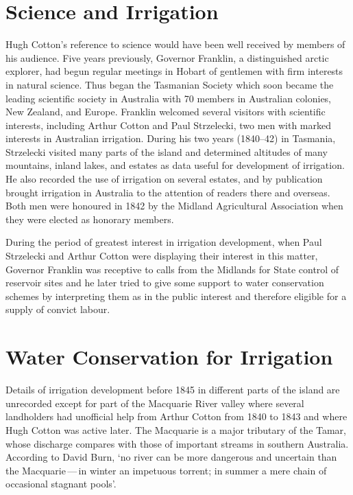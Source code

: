 \section*{Science and Irrigation}

Hugh Cotton's reference to science would have been well received by
members of his audience.  Five years previously, Governor
Franklin, a distinguished arctic explorer,
had begun regular meetings in Hobart of gentlemen with firm interests
in natural science.  Thus began the Tasmanian Society which soon
became the leading scientific society in Australia with 70 members in
Australian colonies, New Zealand, and Europe.  Franklin welcomed
several visitors with scientific interests, including Arthur Cotton
and Paul Strzelecki, two men with marked
interests in Australian irrigation.  During his two years (1840--42)
in Tasmania, Strzelecki visited many parts of the island and
determined altitudes of many mountains, inland lakes, and estates as
data useful for development of irrigation.  He also recorded the use
of irrigation on several estates, and by publication brought
irrigation in Australia to the attention of readers there and
overseas.  Both men were honoured in 1842 by the Midland Agricultural
Association when they were elected as honorary members.

During the period of greatest interest in irrigation development, when
Paul Strzelecki and Arthur Cotton were displaying their interest in
this matter, Governor Franklin was receptive to calls from the
Midlands for State control of reservoir sites and he later tried to
give some support to water conservation schemes by interpreting them
as in the public interest and therefore eligible for a supply of
convict labour.

\section*{Water Conservation for Irrigation}

Details of irrigation development before 1845 in different parts of
the island are unrecorded except for part of the Macquarie
River valley where several landholders had
unofficial help from Arthur Cotton from 1840 to 1843 and where Hugh
Cotton was active later.  The Macquarie is a major tributary of the
Tamar, whose discharge compares with those of
important streams in southern Australia. According to David Burn, `no
river can be more dangerous and uncertain than the Macquarie\,---\,in
winter an impetuous torrent; in summer a mere chain of occasional
stagnant pools'.

